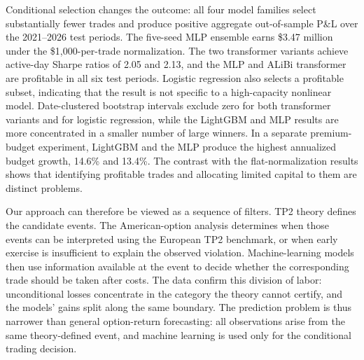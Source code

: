 \documentclass[sigconf,review]{acmart}
\begin{document}
Conditional selection changes the outcome: all four model families select substantially fewer trades and produce positive aggregate out-of-sample P\&L over the 2021--2026 test periods. The five-seed MLP ensemble earns \$3.47 million under the \$1{,}000-per-trade normalization. The two transformer variants achieve active-day Sharpe ratios of 2.05 and 2.13, and the MLP and ALiBi transformer are profitable in all six test periods. Logistic regression also selects a profitable subset, indicating that the result is not specific to a high-capacity nonlinear model. Date-clustered bootstrap intervals exclude zero for both transformer variants and for logistic regression, while the LightGBM and MLP results are more concentrated in a smaller number of large winners. In a separate premium-budget experiment, LightGBM and the MLP produce the highest annualized budget growth, 14.6\% and 13.4\%. The contrast with the flat-normalization results shows that identifying profitable trades and allocating limited capital to them are distinct problems.

Our approach can therefore be viewed as a sequence of filters. TP2 theory defines the candidate events. The American-option analysis determines when those events can be interpreted using the European TP2 benchmark, or when early exercise is insufficient to explain the observed violation. Machine-learning models then use information available at the event to decide whether the corresponding trade should be taken after costs. The data confirm this division of labor: unconditional losses concentrate in the category the theory cannot certify, and the models' gains split along the same boundary. The prediction problem is thus narrower than general option-return forecasting: all observations arise from the same theory-defined event, and machine learning is used only for the conditional trading decision.
\end{document}

